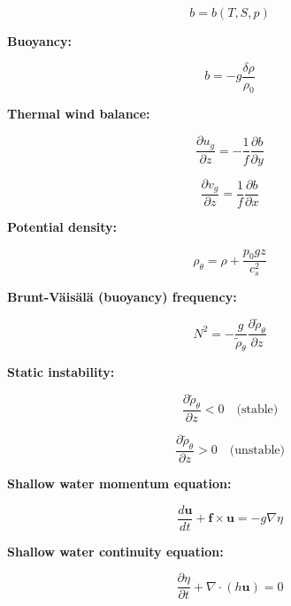 \documentclass[12pt]{article}
\numberwithin{equation}{section}
\numberwithin{figure}{section}
\numberwithin{table}{section}
\begin{document}
\begin{equation}
  b = b(T, S, p)
\end{equation}

\textbf{Buoyancy:}

\begin{equation}
  b = - g \frac{\delta \rho}{\rho_0}
\end{equation}

\textbf{Thermal wind balance:}

\begin{equation}
  \frac{\partial u_g}{\partial z} = - \frac{1}{f} \frac{\partial b}{\partial y}
\end{equation}

\begin{equation}
  \frac{\partial v_g}{\partial z} = \frac{1}{f} \frac{\partial b}{\partial x}
\end{equation}

\textbf{Potential density:}

\begin{equation}
  \rho_\theta = \rho + \frac{p_0 g z}{c_s^2}
\end{equation}

\textbf{Brunt-Väisälä (buoyancy) frequency:}

\begin{equation}
  N^2 = - \frac{g}{\widetilde{\rho}_\theta} \frac{\partial \widetilde{\rho}_\theta}{\partial z}
\end{equation}

\textbf{Static instability:}

\begin{equation}
  \frac{\partial \widetilde{\rho}_\theta}{\partial z} < 0 \quad \text{(stable)}
\end{equation}

\begin{equation}
  \frac{\partial \widetilde{\rho}_\theta}{\partial z} > 0 \quad \text{(unstable)}
\end{equation}

\textbf{Shallow water momentum equation:}

\begin{equation}
  \frac{d \mathbf{u}}{dt} + \mathbf{f} \times \mathbf{u} = - g \nabla \eta
\end{equation}

\textbf{Shallow water continuity equation:}

\begin{equation}
  \frac{\partial \eta}{\partial t} + \nabla \cdot (h \mathbf{u}) = 0
\end{equation}
\end{document}
